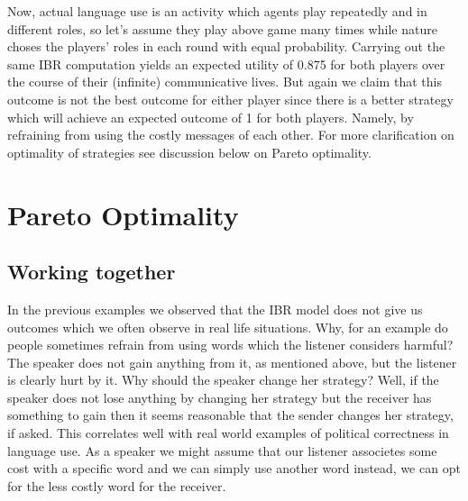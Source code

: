 \documentclass{article}
\begin{document}
Now, actual language use is an activity which agents play repeatedly and in different roles, so let's assume they play above game many times while nature choses the players' roles in each round with equal probability. Carrying out the same IBR computation yields an expected utility of 0.875 for both players over the course of their (infinite) communicative lives. But again we claim that this outcome is not the best outcome for either player since there is a better strategy which will achieve an expected outcome of 1 for both players. Namely, by refraining from using the costly messages of each other. For more clarification on optimality of strategies see discussion below on Pareto optimality.

\begin{comment}
Starting from Spence's seminal "Job Market Signalling", much has been written about games where by sending a message an agent causes a cost. This is the core of so-called \textit{costly signalling games}. Particularly economic theory has been interested in this twist of the Lewisian signaling model.\\
Common assumptions here are that the message's meaning is determined before the start of the game and that sender's cost vector is common knowledge, which, in turn, allows the receiver to distinguish credible and non-credible signals.\\


\begin{table}[h]
\centering
\begin{tabular}{lllll}
States & Cost Sender & Messages & {Cost Receiver} & {Actions} \\ 
$t_1$  & c           & $m_1$    & 0                                  & $a_1$                        \\
$t_2$  & c           & $m_2$    & 0                                  & $a_2$                       
\end{tabular}
\end{table} 
\end{comment}

\section{Pareto Optimality}
\subsection{Working together}
In the previous examples we observed that the IBR model does not give us outcomes which we often observe in real life situations. Why, for an example do people sometimes refrain from using words which the listener considers harmful? The speaker does not gain anything from it, as mentioned above, but the listener is clearly hurt by it. Why should the speaker change her strategy? Well, if the speaker does not lose anything by changing her strategy but the receiver has something to gain then it seems reasonable that the sender changes her strategy, if asked. This correlates well with real world examples of political correctness in language use. As a speaker we might assume that our listener associetes some cost with a specific word and we can simply use another word instead, we can opt for the less costly word for the receiver.
\end{document}
